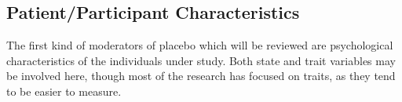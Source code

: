 \subsection{Patient/Participant Characteristics}
\label{sec:psych-char}

The first kind of moderators of placebo which will be reviewed are psychological characteristics of the individuals under study. Both state and trait variables may be involved here, though most of the research has focused on traits, as they tend to be easier to measure. 




